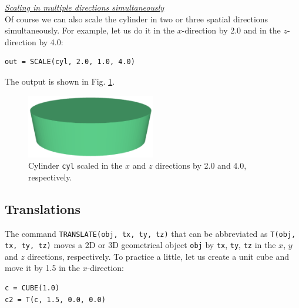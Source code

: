 \noindent
\underline{\em Scaling in multiple directions simultaneously}\\

Of course we can also scale the cylinder in two or three spatial directions 
simultaneously. For example, let us do it in the $x$-direction 
by 2.0 and in the $z$-direction by 4.0:\\

\begin{bbox}
\begin{verbatim}
out = SCALE(cyl, 2.0, 1.0, 4.0)
\end{verbatim}
\end{bbox}
\vspace{6mm}

\noindent
The output is shown in Fig. \ref{fig:scale-4}.


\begin{figure}[!ht]
\begin{center}
\includegraphics[width=0.5\textwidth]{img/scale-4.png}
\end{center}
\vspace{-4mm}
\caption{Cylinder {\tt cyl} scaled in the $x$ and $z$ directions by 2.0 and 4.0, respectively.}
\label{fig:scale-4}
\vspace{-1cm}
\end{figure}
\newpage

\subsection{Translations} \label{sec:translate}

The command {\tt TRANSLATE(obj, tx, ty, tz)} that can be abbreviated as 
{\tt T(obj, tx, ty, tz)} moves a 2D or 3D geometrical object {\tt obj} by {\tt tx}, {\tt ty},
{\tt tz} in the $x$, $y$ and $z$ directions, respectively. To practice
a little, let us create a unit cube and move it by 1.5 in the $x$-direction:\\

\begin{bbox}
\begin{verbatim}
c = CUBE(1.0)
c2 = T(c, 1.5, 0.0, 0.0)
\end{verbatim}
\end{bbox}
\vspace{6mm}

